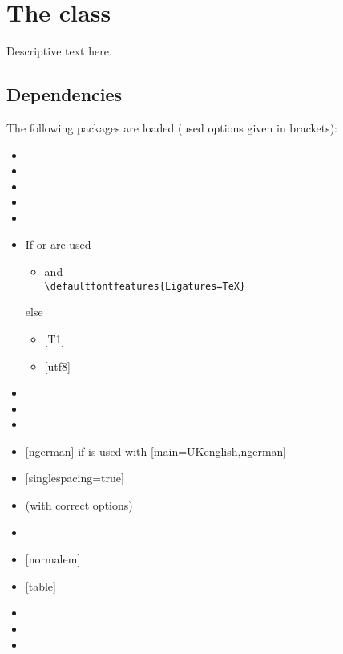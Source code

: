 \chapter{The  class}
Descriptive text here.

\section{Dependencies}
The following packages are loaded (used options given in brackets):
\vspace*{-\multicolsep}%
\begin{multicols}{2}%
  \begin{itemize}
    \item {}
    \item {}
    \item {}
    \item {}
    \item {}
    \item If  or  are used
      \begin{itemize}[topsep=0pt]
        \item {} and\\\verb|\defaultfontfeatures{Ligatures=TeX}|
      \end{itemize}
      else
      \begin{itemize}[topsep=0pt]
        \item {} [T1]
        \item {} [utf8]
      \end{itemize}
    \item {}
    \item {}
    \item {}
    \item {} [ngerman] if  is used with
      [main=UKenglish,ngerman]
    \item {} [singlespacing=true]
    \item {} (with correct options)
    \item {}
    \item {} [normalem]
    \item {} [table]
    \item {}
    \item {}
    \item {}

\end{itemize}
\end{multicols}
